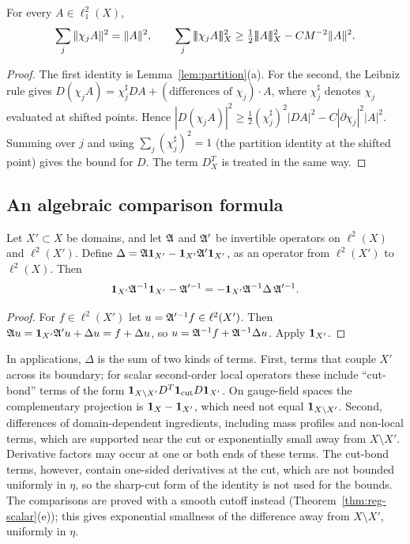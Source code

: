 \begin{lemma}\label{lem:local-norms}
For every $A\in\ell^2_1(X)$,
\[
\sum_j\|\chi_jA\|^2=\|A\|^2,\qquad \sum_j\tn{\chi_jA}_X^2\ge\tfrac12\tn A_X^2-CM^{-2}\|A\|^2 .
\]
\end{lemma}

\begin{proof}
The first identity is Lemma~\ref{lem:partition}(a). For the second, the Leibniz rule gives $D(\chi_jA)=\chi_j^{\sharp}DA+(\text{differences of }\chi_j)\cdot A$, where $\chi_j^\sharp$ denotes $\chi_j$ evaluated at shifted points. Hence $|D(\chi_jA)|^2\ge\frac12(\chi_j^\sharp)^2|DA|^2-C|\partial\chi_j|^2|A|^2$. Summing over $j$ and using $\sum_j(\chi_j^\sharp)^2=1$ (the partition identity at the shifted point) gives the bound for $D$. The term $D^T_X$ is treated in the same way.
\end{proof}

\subsection{An algebraic comparison formula}\label{ss:17.3}

\begin{lemma}\label{lem:compare-inverse}
Let $X'\subset X$ be domains, and let $\mathfrak A$ and $\mathfrak A'$ be invertible operators on $\ell^2(X)$ and $\ell^2(X')$. Define $\Delta=\mathfrak A\mathbf 1_{X'}-\mathbf 1_{X'}\mathfrak A'\mathbf 1_{X'}$, as an operator from $\ell^2(X')$ to $\ell^2(X)$. Then
\[
\mathbf 1_{X'}\mathfrak A^{-1}\mathbf 1_{X'}-\mathfrak A'^{-1}=-\mathbf 1_{X'}\mathfrak A^{-1}\Delta\,\mathfrak A'^{-1}.
\]
\end{lemma}

\begin{proof}
For $f\in\ell^2(X')$ let $u=\mathfrak A'^{-1}f\in\ell^2(X')$. Then $\mathfrak A u=\mathbf 1_{X'}\mathfrak A'u+\Delta u=f+\Delta u$, so $u=\mathfrak A^{-1}f+\mathfrak A^{-1}\Delta u$. Apply $\mathbf 1_{X'}$.
\end{proof}

In applications, $\Delta$ is the sum of two kinds of terms. First, terms that couple $X'$ across its boundary; for scalar second-order local operators these include ``cut-bond'' terms of the form $\mathbf 1_{X\setminus X'}D^T\mathbf 1_{\rm cut}D\mathbf 1_{X'}$. On gauge-field spaces the complementary projection is $\mathbf 1_X-\mathbf 1_{X'}$, which need not equal $\mathbf 1_{X\setminus X'}$. Second, differences of domain-dependent ingredients, including mass profiles and non-local terms, which are supported near the cut or exponentially small away from $X\setminus X'$. Derivative factors may occur at one or both ends of these terms. The cut-bond terms, however, contain one-sided derivatives at the cut, which are not bounded uniformly in $\eta$, so the sharp-cut form of the identity is not used for the bounds. The comparisons are proved with a smooth cutoff instead (Theorem~\ref{thm:reg-scalar}(e)); this gives exponential smallness of the difference away from $X\setminus X'$, uniformly in $\eta$.
